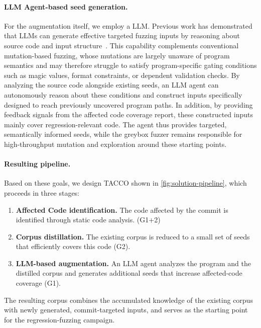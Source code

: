 \paragraph{LLM Agent-based seed generation.}
For the augmentation itself, we employ a \ac{LLM}. Previous
work has demonstrated that \acp{LLM} can generate effective targeted fuzzing inputs by
reasoning about source code and input
structure~\cite{liuEvaluatingLLMBasedRegression2026, zhuSeedSmithLLMDrivenSeed2026,
xuDirectedGreyboxFuzzing2025, xuISC4DGFEnhancingDirected2024,
fengFuzzingRandomnessReasoning2025}. This capability complements conventional
mutation-based fuzzing, whose mutations are largely unaware of program semantics
and may therefore struggle to satisfy program-specific gating conditions such as
magic values, format constraints, or dependent validation checks. By analyzing
the source code alongside existing seeds, an \ac{LLM} agent can autonomously reason about these
conditions and construct inputs specifically designed to reach previously
uncovered program paths. In addition, by providing feedback signals from the affected code coverage report, these constructed inputs mainly cover regression-relevant code. The agent thus provides targeted, semantically informed
seeds, while the greybox fuzzer remains responsible for high-throughput mutation
and exploration around these starting points.



\paragraph{Resulting pipeline.}
Based on these goals, we design TACCO shown in
\cref{fig:solution-pipeline}, which proceeds in three stages:

\begin{enumerate}
  \item \textbf{Affected Code identification.} The code affected by the commit is
    identified through static code analysis. (G1+2)
  \item \textbf{Corpus distillation.} The existing corpus is reduced to a small
    set of seeds that efficiently covers this code (G2).
  \item \textbf{LLM-based augmentation.} An \ac{LLM} agent analyzes the program and
    the distilled corpus and generates additional seeds that increase
    affected-code coverage (G1).
\end{enumerate}

\noindent
The resulting corpus combines the accumulated knowledge of the existing corpus
with newly generated, commit-targeted inputs, and serves as the starting point
for the regression-fuzzing campaign.

